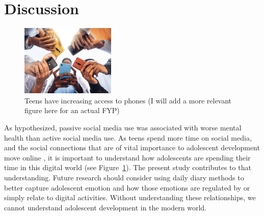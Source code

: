 \newpage
\section{Discussion}
\begin{figure}     \centering       
\includegraphics[width=0.4\textwidth]{phones.png}
\caption{\label{fig:latbrain}Teens have increasing access to phones (I will add a more relevant figure here for an actual FYP)}
\end{figure}

As hypothesized, passive social media use was associated with worse mental health than active social media use. As teens spend more time on social media, and the social connections that are of vital importance to adolescent development move online \citep{hollensteinreview2024}, it is important to understand how adolescents are spending their time in this digital world (see Figure~\ref{fig:latbrain}). The present study contributes to that understanding. Future research should consider using daily diary methods to better capture adolescent emotion and how those emotions are regulated by or simply relate to digital activities. Without understanding these relationships, we cannot understand adolescent development in the modern world.



